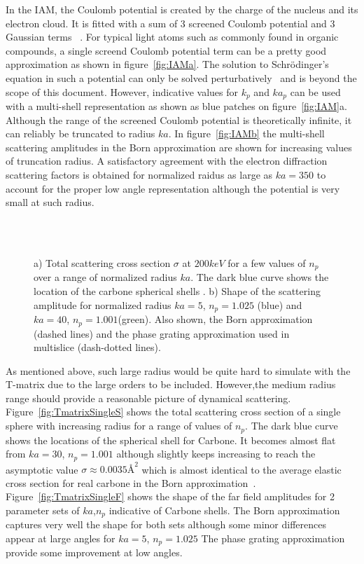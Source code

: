 In the IAM, the Coulomb potential is created by the charge of the nucleus and its
electron cloud. It is fitted with a sum of 3 screened Coulomb potential and
3 Gaussian terms ~\cite{Kirkland2019}.
For typical light atoms such as commonly found in organic compounds, a single
screend Coulomb potential term can be a pretty good approximation as shown in
figure~\ref{fig:IAMa}. The solution to Schr{\"o}dinger's equation in such a
potential can only be solved perturbatively~\cite{Muller1965} and is beyond the
scope of this document. However, indicative values for $k_p$ and $ka_p$
can be used with a multi-shell representation as shown as blue patches on
figure~\ref{fig:IAM}a. Although the range of the screened Coulomb potential
is theoretically infinite, it can reliably be truncated to radius $ka$.
In figure~\ref{fig:IAMb} the multi-shell scattering amplitudes in the Born
approximation are shown for increasing values of truncation radius.
A satisfactory agreement with the electron diffraction scattering factors is obtained for normalized raidus
as large as $ka=350$ to account for the proper low angle representation
although the potential is very small at such radius.


\begin{figure}[h!]
  \centering
  \\
  \vspace{-1.1em}
  \\
\caption{
a) Total scattering cross section $\sigma$ at $200keV$ for a few
values of $n_p$ over a range of normalized radius $ka$. The dark blue
curve shows the location of the carbone spherical shells .
b) Shape of the scattering amplitude for normalized radius
$ka=5$, $n_p=1.025$ (blue)
and $ka=40$, $n_p=1.001$(green).
Also shown, the Born approximation (dashed lines) and
the phase grating approximation used in multislice (dash-dotted lines).
}%
\end{figure}

As mentioned above, such large radius would be quite hard to simulate with
the T-matrix due to the large orders to be included. However,the medium radius
range should provide a reasonable picture of dynamical scattering.
Figure~\ref{fig:TmatrixSingleS} shows the total scattering cross section of
a single sphere with increasing radius for a range of values of $n_p$. The dark
blue curve shows the locations of the spherical shell for Carbone. It becomes almost
flat from $ka=30$, $n_p=1.001$ although slightly keeps increasing to reach the
asymptotic value $\sigma\approx 0.0035\text{\AA}^2$ which is almost identical to the
average elastic cross section for real carbone in the Born approximation~\cite{Latychevskaia2019}.
Figure~\ref{fig:TmatrixSingleF} shows the shape of the far field
amplitudes for 2 parameter sets of $ka$,$n_p$ indicative of Carbone shells.
The Born approximation captures very well the shape for both sets
although some minor differences appear at large angles for $ka=5$, $n_p=1.025$
The phase grating approximation provide some improvement at low angles.

